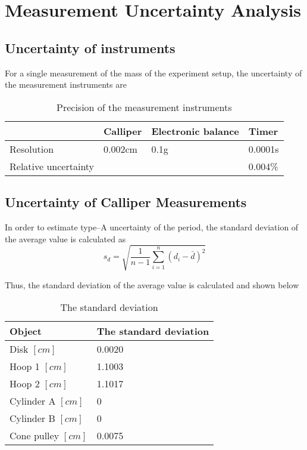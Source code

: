 \section{Measurement Uncertainty Analysis}


\subsection{Uncertainty of instruments}
For a single measurement of the mass of the experiment setup, the uncertainty of the measurement instruments are

\begin{table}[H]
  \centering
  \begin{tabularx}{\textwidth}{|X|X|X|X|}
    \hline
     & Calliper & Electronic balance & Timer\\
	 \hline
	 Resolution & 0.002cm & 0.1g & 0.0001s \\
	 \hline
	 Relative uncertainty &\multicolumn{2}{c|}{}& 0.004\% \\
	\hline
  \end{tabularx}
  \caption{Precision of the measurement instruments}
  \end{table}

\subsection{Uncertainty of Calliper Measurements}

In order to estimate type–A uncertainty of the period, the standard deviation of the average value is calculated as
$$  s_d = \sqrt{\frac{1}{n-1}\sum_{i=1}^{n}(d_i - \bar{d})^2 }  $$

Thus, the standard deviation of the average value is calculated and shown below

\begin{table}[H]
  \centering
  \begin{tabularx}{\textwidth}{|p{6cm}|X|}
    \hline
    Object & The standard deviation\\
    \hline
    Disk $[cm]$& 0.0020 \\
    Hoop 1 $[cm]$& 1.1003 \\
    Hoop 2 $[cm]$& 1.1017 \\
    Cylinder A $[cm]$& 0 \\
    Cylinder B $[cm]$& 0 \\
    Cone pulley $[cm]$& 0.0075 \\
    \hline
  \end{tabularx}
  \caption{The standard deviation}
  \end{table}


